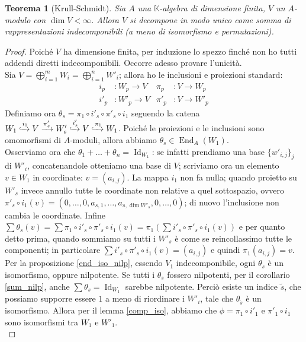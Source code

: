 \documentclass[11pt]{article}
\theoremstyle{plain}
\newtheorem{thm}{Teorema}[section]
\theoremstyle{definition}
\theoremstyle{remark}
\newcommand{\K}{\mathbb{K}}
\DeclareMathOperator{\End}{End}
\DeclareMathOperator{\Id}{Id}
\begin{document}
	\begin{thm}[Krull-Schmidt]\label{thm:krull-schmidt}
		Sia $A$ una $\K$-algebra di dimensione finita, $V$ un $A$-modulo con $\dim V<\infty$. Allora $V$ si decompone in modo unico come somma di rappresentazioni indecomponibili (a meno di isomorfismo e permutazioni).
	\end{thm}
	\begin{proof}
	 Poiché $V$ ha dimensione finita, per induzione lo spezzo finché non ho tutti addendi diretti indecomponibili. Occorre adesso provare l'unicità.\\
	 Sia $V=\bigoplus_{i=1}^m W_i=\bigoplus_{i=1}^n W'_i$; allora ho le inclusioni e proiezioni standard: \begin{align*} i_p &:  W_p\to V & \pi_p &: V\to W_p \\ i'_p &:  W'_p\to V & \pi'_p &: V\to W'_p\end{align*}
	 Definiamo ora $\theta_s=\pi_1\circ i'_s\circ \pi'_s\circ i_1$ seguendo la catena $W_1\xhookrightarrow{i_1} V\xrightarrow{\pi'_s}W'_s\xhookrightarrow{i'_s} V\xhookrightarrow{\pi_1} W_1$.
	 Poiché le proiezioni e le inclusioni sono omomorfismi di $A$-moduli, allora abbiamo $\theta_s\in\End_A(W_1)$.\\
	 Osserviamo ora che $\theta_1+\dots+\theta_n=\Id_{W_1}$: se infatti prendiamo una base $\{w'_{i,j}\}_j$ di $W'_i$, concatenandole otteniamo una base di $V$; scriviamo ora un elemento $v\in W_1$ in coordinate: $v=(a_{i,j})$.
	 La mappa $i_1$ non fa nulla; quando proietto su $W'_s$ invece annullo tutte le coordinate non relative a quel sottospazio, ovvero $\pi'_s\circ i_1(v)=(0,\dots,0,a_{s,1},\dots,a_{s,\dim W'_s},0,\dots,0)$; di nuovo l'inclusione non cambia le coordinate.
	 Infine $\displaystyle\sum\theta_s(v)=\sum \pi_1\circ i'_s\circ \pi'_s\circ i_1(v)=\pi_1\left( \sum i'_s\circ \pi'_s\circ i_1(v) \right)$ e per quanto detto prima, quando sommiamo su tutti i $W'_s$ è come se reincollassimo tutte le componenti; in particolare $\sum i'_s\circ \pi'_s\circ i_1(v)=(a_{i,j})$ e quindi $\pi_1(a_{i,j})=v$.\\
	 Per la proposizione \ref{end_iso_nilp}, essendo $V_1$ indecomponibile, ogni $\theta_s$ è un isomorfismo, oppure nilpotente. Se tutti i $\theta_s$ fossero nilpotenti, per il corollario \ref{sum_nilp}, anche $\sum\theta_s=\Id_{W_1}$ sarebbe nilpotente.
	 Perciò esiste un indice $\tilde s$, che possiamo supporre essere $1$ a meno di riordinare i $W'_i$, tale che $\theta_{\tilde s}$ è un isomorfismo.
	 Allora per il lemma \ref{comp_iso}, abbiamo che $\phi=\pi_1\circ i'_1$ e $\pi'_1\circ i_1$ sono isomorfismi tra $W_1$ e $W'_1$.\\

\end{proof}
\end{document}
